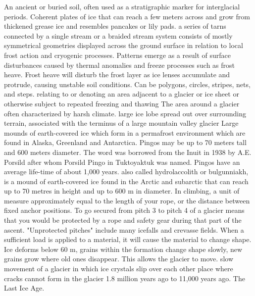  An ancient or buried soil, often used as a stratigraphic marker for interglacial periods.
 Coherent plates of ice that can reach a few meters across and grow from thickened grease ice and resembles pancakes or lily pads.
 a series of tarns connected by a single stream or a braided stream system
 consists of mostly symmetrical geometries displayed across the ground surface in relation to local frost action and cryogenic processes. Patterns emerge as a result of surface disturbances caused by thermal anomalies and freeze processes such as frost heave. Frost heave will disturb the frost layer as ice lenses accumulate and protrude, causing unstable soil conditions. Can be polygons, circles, stripes, nets, and steps.
 relating to or denoting an area adjacent to a glacier or ice sheet or otherwise subject to repeated freezing and thawing
 The area around a glacier often characterized by harsh climate.
 large ice lobe spread out over surrounding terrain, associated with the terminus of a large mountain valley glacier
 Large mounds of earth-covered ice which form in a permafrost environment which are found in Alaska, Greenland and Antarctica. Pingos may be up to 70 meters tall and 600 meters diameter. The word was borrowed from the Inuit in 1938 by A.E. Porsild after whom Porsild Pingo in Tuktoyaktuk was named. Pingos have an average life-time of about 1,000 years.
 also called hydrolaccolith or bulgunniakh, is a mound of earth-covered ice found in the Arctic and subarctic that can reach up to 70 metres in height and up to 600 m in diameter.
 In climbing, a unit of measure approximately equal to the length of your rope, or the distance between fixed anchor positions. To go secured from pitch 3 to pitch 4 of a glacier means that you would be protected by a rope and safety gear during that part of the ascent. "Unprotected pitches" include many icefalls and crevasse fields.
 When a sufficient load is applied to a material, it will cause the material to change shape. Ice deforms below 60 m, grains within the formation change shape slowly, new grains grow where old ones disappear. This allows the glacier to move.
 slow movement of a glacier in which ice crystals slip over each other
 place where cracks cannot form in the glacier
 1.8 million years ago to 11,000 years ago. The Last Ice Age.
